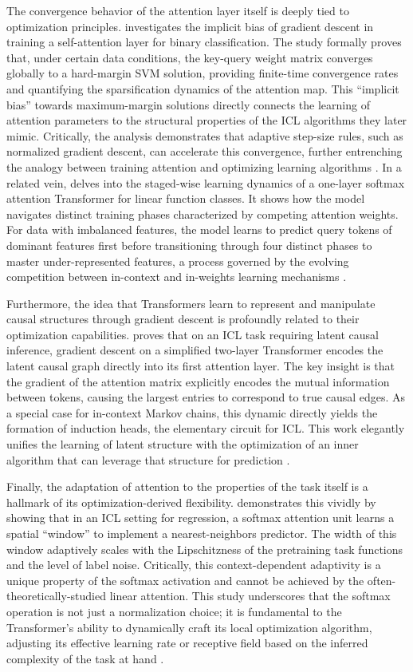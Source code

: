 \documentclass[11pt]{article}
\begin{document}
The convergence behavior of the attention layer itself is deeply tied to optimization principles. \cite{ref17} investigates the implicit bias of gradient descent in training a self-attention layer for binary classification. The study formally proves that, under certain data conditions, the key-query weight matrix converges globally to a hard-margin SVM solution, providing finite-time convergence rates and quantifying the sparsification dynamics of the attention map. This ``implicit bias'' towards maximum-margin solutions directly connects the learning of attention parameters to the structural properties of the ICL algorithms they later mimic. Critically, the analysis demonstrates that adaptive step-size rules, such as normalized gradient descent, can accelerate this convergence, further entrenching the analogy between training attention and optimizing learning algorithms \cite{ref17}. In a related vein, \cite{ref18} delves into the staged-wise learning dynamics of a one-layer softmax attention Transformer for linear function classes. It shows how the model navigates distinct training phases characterized by competing attention weights. For data with imbalanced features, the model learns to predict query tokens of dominant features first before transitioning through four distinct phases to master under-represented features, a process governed by the evolving competition between in-context and in-weights learning mechanisms \cite{ref18}.

Furthermore, the idea that Transformers learn to represent and manipulate causal structures through gradient descent is profoundly related to their optimization capabilities. \cite{ref19} proves that on an ICL task requiring latent causal inference, gradient descent on a simplified two-layer Transformer encodes the latent causal graph directly into its first attention layer. The key insight is that the gradient of the attention matrix explicitly encodes the mutual information between tokens, causing the largest entries to correspond to true causal edges. As a special case for in-context Markov chains, this dynamic directly yields the formation of induction heads, the elementary circuit for ICL. This work elegantly unifies the learning of latent structure with the optimization of an inner algorithm that can leverage that structure for prediction \cite{ref19}.

Finally, the adaptation of attention to the properties of the task itself is a hallmark of its optimization-derived flexibility. \cite{ref20} demonstrates this vividly by showing that in an ICL setting for regression, a softmax attention unit learns a spatial ``window'' to implement a nearest-neighbors predictor. The width of this window adaptively scales with the Lipschitzness of the pretraining task functions and the level of label noise. Critically, this context-dependent adaptivity is a unique property of the softmax activation and cannot be achieved by the often-theoretically-studied linear attention. This study underscores that the softmax operation is not just a normalization choice; it is fundamental to the Transformer's ability to dynamically craft its local optimization algorithm, adjusting its effective learning rate or receptive field based on the inferred complexity of the task at hand \cite{ref20}.
\end{document}
